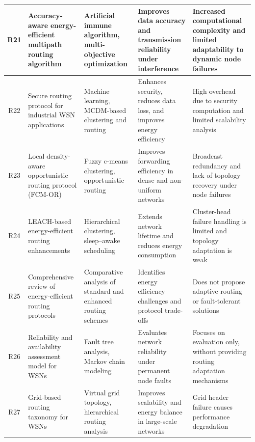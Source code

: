 \documentclass[a4paper,fleqn]{cas-dc}
\numberwithin{equation}{section}
\begin{document}
\begin{table}[ht]
{\begin{tabular}{|c|p{3.2cm}|p{3.5cm}|p{3.8cm}|p{3.8cm}|}
R21 & Accuracy-aware energy-efficient multipath routing algorithm \cite{dan2024accuracy} 
& Artificial immune algorithm, multi-objective optimization 
& Improves data accuracy and transmission reliability under interference 
& Increased computational complexity and limited adaptability to dynamic node failures \\
\hline

R22 & Secure routing protocol for industrial WSN applications \cite{onyema2025secure} 
& Machine learning, MCDM-based clustering and routing 
& Enhances security, reduces data loss, and improves energy efficiency 
& High overhead due to security computation and limited scalability analysis \\
\hline

R23 & Local density-aware opportunistic routing protocol (FCM-OR) \cite{lata2025fcm} 
& Fuzzy c-means clustering, opportunistic routing 
& Improves forwarding efficiency in dense and non-uniform networks 
& Broadcast redundancy and lack of topology recovery under node failures \\
\hline

R24 & LEACH-based energy-efficient routing enhancements \cite{siamantas2025energy} 
& Hierarchical clustering, sleep--awake scheduling 
& Extends network lifetime and reduces energy consumption 
& Cluster-head failure handling is limited and topology adaptation is weak \\
\hline

R25 & Comprehensive review of energy-efficient routing protocols \cite{bekal2024comprehensive} 
& Comparative analysis of standard and enhanced routing schemes 
& Identifies energy efficiency challenges and protocol trade-offs 
& Does not propose adaptive routing or fault-tolerant solutions \\
\hline

R26 & Reliability and availability assessment model for WSNs \cite{heidari2024assessment} 
& Fault tree analysis, Markov chain modeling 
& Evaluates network reliability under permanent node faults 
& Focuses on evaluation only, without providing routing adaptation mechanisms \\
\hline

R27 & Grid-based routing taxonomy for WSNs \cite{jain2024taxonomy} 
& Virtual grid topology, hierarchical routing analysis 
& Improves scalability and energy balance in large-scale networks 
& Grid header failure causes performance degradation \\
\hline


\end{tabular}}
\end{table}
\end{document}
